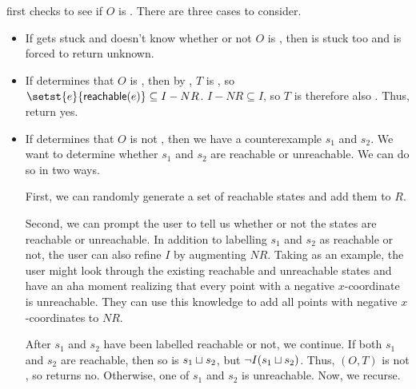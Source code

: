 \Helper{} first checks to see if $O$ is . There are three
cases to consider.
\begin{itemize}
  \item
    If \IsIclosed{} gets stuck and doesn't know whether or not $O$ is
    , then \Helper{} is stuck too and is forced to return
    unknown.
  \item
    If \IsIclosed{} determines that $O$ is , then by
    , $T$ is , so
    $\setst{e}{\reachable{e}} \subseteq I - NR$. $I - NR \subseteq I$, so $T$
    is therefore also \Iconfluent{}. Thus, \Helper{} return yes.
  \item
    If \IsIclosed{} determines that $O$ is not , then we
    have a counterexample $s_1$ and $s_2$. We want to determine whether $s_1$
    and $s_2$ are reachable or unreachable. We can do so in two ways.

    First, we can randomly generate a set of reachable states and add them to
    $R$.

    Second, we can prompt the user to tell us whether or not the states are
    reachable or unreachable. In addition to labelling $s_1$ and $s_2$ as
    reachable or not, the user can also refine $I$ by augmenting $NR$. Taking
     as an example, the user might look
    through the existing reachable and unreachable states and have an aha
    moment realizing that every point with a negative $x$-coordinate is
    unreachable. They can use this knowledge to add all points with negative
    $x$-coordinates to $NR$.

    After $s_1$ and $s_2$ have been labelled reachable or not, we continue. If
    both $s_1$ and $s_2$ are reachable, then so is $s_1 \sqcup s_2$, but $\lnot
    I(s_1 \sqcup s_2)$. Thus, $(O, T)$ is not \Iconfluent{}, so \Helper{}
    returns no.  Otherwise, one of $s_1$ and $s_2$ is unreachable. Now, we
    recurse.
\end{itemize}

